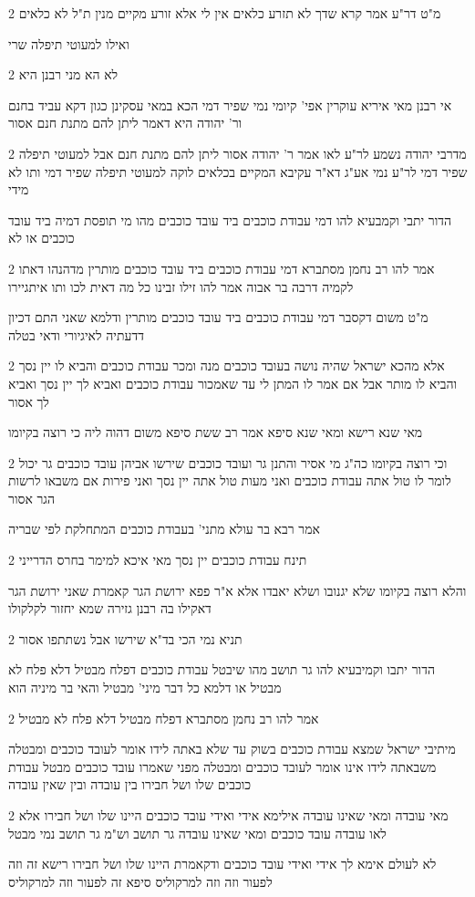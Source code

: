 \documentclass[12pt, openany]{book}
\newcommand{\sethebfont}{
\fontsize{10.5pt}{21.0pt} \selectfont
}
\newcommand{\twocol}[1]{
	{\sethebfont \begin{multicols}{2}
			#1
	\end{multicols}}	
}
\begin{document}
\twocol{מ"ט דר"ע אמר קרא שדך לא תזרע כלאים אין לי אלא זורע מקיים מנין ת"ל לא כלאים
\par ואילו למעוטי תיפלה שרי}
\twocol{לא הא מני רבנן היא
\par אי רבנן מאי איריא עוקרין אפי' קיומי נמי שפיר דמי הכא במאי עסקינן כגון דקא עביד בחנם ור' יהודה היא דאמר ליתן להם מתנת חנם אסור}
\twocol{מדרבי יהודה נשמע לר"ע לאו אמר ר' יהודה אסור ליתן להם מתנת חנם אבל למעוטי תיפלה שפיר דמי לר"ע נמי אע"ג דא"ר עקיבא המקיים בכלאים לוקה למעוטי תיפלה שפיר דמי ותו לא מידי
\par הדור יתבי וקמבעיא להו דמי עבודת כוכבים ביד עובד כוכבים מהו מי תופסת דמיה ביד עובד כוכבים או לא}
\twocol{אמר להו רב נחמן מסתברא דמי עבודת כוכבים ביד עובד כוכבים מותרין מדהנהו דאתו לקמיה דרבה בר אבוה אמר להו זילו זבינו כל מה דאית לכו ותו איתגיירו
\par מ"ט משום דקסבר דמי עבודת כוכבים ביד עובד כוכבים מותרין ודלמא שאני התם דכיון דדעתיה לאיגיורי ודאי בטלה}
\twocol{אלא מהכא ישראל שהיה נושה בעובד כוכבים מנה ומכר עבודת כוכבים והביא לו יין נסך והביא לו מותר אבל אם אמר לו המתן לי עד שאמכור עבודת כוכבים ואביא לך יין נסך ואביא לך אסור
\par מאי שנא רישא ומאי שנא סיפא אמר רב ששת סיפא משום דהוה ליה כי רוצה בקיומו}
\twocol{וכי רוצה בקיומו כה"ג מי אסיר והתנן גר ועובד כוכבים שירשו אביהן עובד כוכבים גר יכול לומר לו טול אתה עבודת כוכבים ואני מעות טול אתה יין נסך ואני פירות אם משבאו לרשות הגר אסור
\par אמר רבא בר עולא מתני' בעבודת כוכבים המתחלקת לפי שבריה}
\twocol{תינח עבודת כוכבים יין נסך מאי איכא למימר בחרס הדרייני
\par והלא רוצה בקיומו שלא יגנובו ושלא יאבדו אלא א"ר פפא ירושת הגר קאמרת שאני ירושת הגר דאקילו בה רבנן גזירה שמא יחזור לקלקולו}
\twocol{תניא נמי הכי בד"א שירשו אבל נשתתפו אסור
\par הדור יתבו וקמיבעיא להו גר תושב מהו שיבטל עבודת כוכבים דפלח מבטיל דלא פלח לא מבטיל או דלמא כל דבר מיני' מבטיל והאי בר מיניה הוא}
\twocol{אמר להו רב נחמן מסתברא דפלח מבטיל דלא פלח לא מבטיל
\par מיתיבי ישראל שמצא עבודת כוכבים בשוק עד שלא באתה לידו אומר לעובד כוכבים ומבטלה משבאתה לידו אינו אומר לעובד כוכבים ומבטלה מפני שאמרו עובד כוכבים מבטל עבודת כוכבים שלו ושל חבירו בין עובדה ובין שאין עובדה}
\twocol{מאי עובדה ומאי שאינו עובדה אילימא אידי ואידי עובד כוכבים היינו שלו ושל חבירו אלא לאו עובדה עובד כוכבים ומאי שאינו עובדה גר תושב וש"מ גר תושב נמי מבטל
\par לא לעולם אימא לך אידי ואידי עובד כוכבים ודקאמרת היינו שלו ושל חבירו רישא זה וזה לפעור וזה וזה למרקוליס סיפא זה לפעור וזה למרקוליס}
\end{document}
